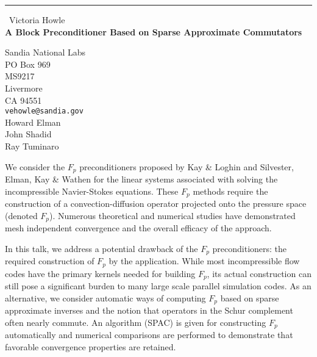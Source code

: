 \documentclass{report}
\begin{document}
\begin{center}
\rule{6in}{1pt} \
{\large Victoria Howle \\
{\bf A Block Preconditioner Based on Sparse Approximate Commutators}}

Sandia National Labs \\ PO Box 969 \\ MS9217 \\ Livermore \\ CA 94551
\\
{\tt vehowle@sandia.gov}\\
Howard Elman\\
John Shadid\\
	Ray Tuminaro\end{center}

We consider the $F_p$ preconditioners proposed by Kay \& Loghin and
Silvester, Elman, Kay \& Wathen for the linear systems associated with
solving the incompressible Navier-Stokes equations. These $F_p$ methods
require the construction of a convection-diffusion operator projected
onto the pressure space (denoted $F_p$). Numerous theoretical and
numerical studies have demonstrated mesh independent convergence and the
overall efficacy of the approach.

In this talk, we address a potential drawback of the $F_p$
preconditioners: the required construction of $F_p$ by the application.
While most incompressible flow codes have the primary kernels needed for
building $F_p$, its actual construction can still pose a significant
burden to many large scale parallel simulation codes. As an alternative,
we consider automatic ways of computing $F_p$ based on sparse approximate
inverses and the notion that operators in the Schur complement often
nearly commute. An algorithm (SPAC) is given for constructing $F_p$
automatically and numerical comparisons are performed to demonstrate that
favorable convergence properties are retained.
\end{document}
